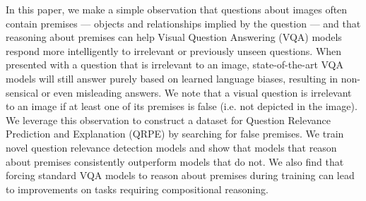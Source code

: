 In this paper, we make a simple observation that questions about images often contain premises --- objects and relationships implied by the question --- and that reasoning about premises can help Visual Question Answering (VQA) models respond more intelligently to irrelevant or previously unseen questions. When presented with a question that is irrelevant to an image, state-of-the-art VQA models will still answer purely based on learned language biases, resulting in non-sensical or even misleading answers. We note that a visual question is irrelevant to an image if at least one of its premises is false (i.e. not depicted in the image). We leverage this observation to construct a dataset for Question Relevance Prediction and Explanation (QRPE) by searching for false premises. We train novel question relevance detection models and show that models that reason about premises consistently outperform models that do not. We also find that forcing standard VQA models to reason about premises during training can lead to improvements on tasks requiring compositional reasoning.
